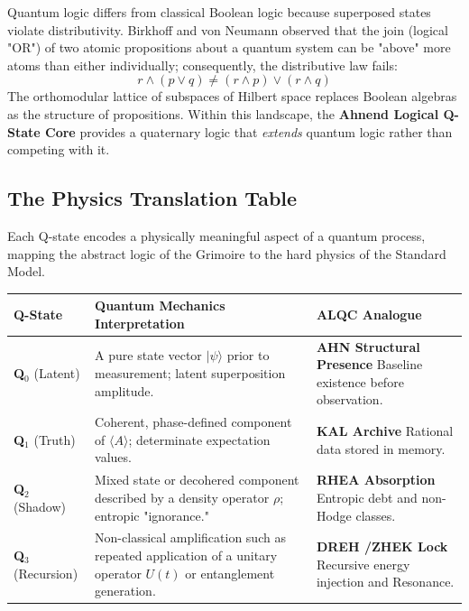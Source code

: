 \documentclass[12pt]{amsart}
\newcommand{\KAL}{\ensuremath{\mathop{\textnormal{\symbolafont\symbol{"2B21}}}}}    %
\newcommand{\AHN}{\ensuremath{\mathop{\textnormal{\symbolafont\symbol{"269D}}}}}    %
\newcommand{\DREH}{\ensuremath{\mathop{\textnormal{\symbolafont\symbol{"29D7}}}}}   %
\newcommand{\RHEA}{\ensuremath{\mathop{\textnormal{\symbolafont\symbol{"229B}}}}}   %
\newcommand{\ZHEK}{\ensuremath{\mathop{\textnormal{\symbolafont\symbol{"2744}}}}}   %
\def\KAL{KAL}%
\def\AHN{AHN}%
\def\DREH{DREH}%
\def\RHEA{RHEA}%
\def\ZHEK{ZHEK}%
\begin{document}
Quantum logic differs from classical Boolean logic because superposed states violate distributivity. Birkhoff and von Neumann observed that the join (logical "OR") of two atomic propositions about a quantum system can be "above" more atoms than either individually; consequently, the distributive law fails:
\[
r \land (p \lor q) \neq (r \land p) \lor (r \land q)
\]
The orthomodular lattice of subspaces of Hilbert space replaces Boolean algebras as the structure of propositions. Within this landscape, the \textbf{Ahnend Logical Q-State Core} provides a quaternary logic that \textit{extends} quantum logic rather than competing with it.

\subsection{The Physics Translation Table}\label{appendixK.3}

Each Q-state encodes a physically meaningful aspect of a quantum process, mapping the abstract logic of the Grimoire to the hard physics of the Standard Model.

\begin{center}
\begin{longtable}{p{2.5cm} p{5.5cm} p{5.5cm}}
\toprule
\textbf{Q-State} & \textbf{Quantum Mechanics Interpretation} & \textbf{ALQC Analogue} \\
\midrule
\endhead

\textbf{Q$_0$} \newline (Latent) & A pure state vector $|\psi\rangle$ prior to measurement; latent superposition amplitude. & \textbf{\AHN{} Structural Presence} \newline Baseline existence before observation. \\
\addlinespace[1ex]

\textbf{Q$_1$} \newline (Truth) & Coherent, phase-defined component of $\langle A \rangle$; determinate expectation values. & \textbf{\KAL{} Archive} \newline Rational data stored in memory. \\
\addlinespace[1ex]

\textbf{Q$_2$} \newline (Shadow) & Mixed state or decohered component described by a density operator $\rho$; entropic "ignorance." & \textbf{\RHEA{} Absorption} \newline Entropic debt and non-Hodge classes. \\
\addlinespace[1ex]

\textbf{Q$_3$} \newline (Recursion) & Non-classical amplification such as repeated application of a unitary operator $U(t)$ or entanglement generation. & \textbf{\DREH{} \slash  \ZHEK{} Lock} \newline Recursive energy injection and Resonance. \\

\bottomrule
\end{longtable}
\end{center}
\end{document}
